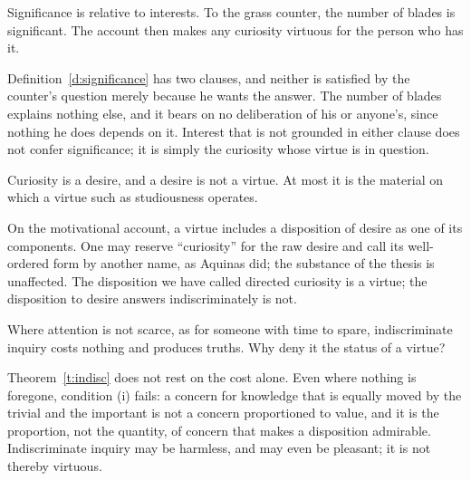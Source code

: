 \documentclass{situationist-preprint}
\begin{document}
\begin{objection}[Subjectivity]
Significance is relative to interests. To the grass counter, the number of blades is significant. The account then makes any curiosity virtuous for the person who has it.
\end{objection}

\begin{reply}
Definition~\ref{d:significance} has two clauses, and neither is satisfied by the counter's question merely because he wants the answer. The number of blades explains nothing else, and it bears on no deliberation of his or anyone's, since nothing he does depends on it. Interest that is not grounded in either clause does not confer significance; it is simply the curiosity whose virtue is in question.
\end{reply}

\begin{objection}
Curiosity is a desire, and a desire is not a virtue. At most it is the material on which a virtue such as studiousness operates.
\end{objection}

\begin{reply}
On the motivational account, a virtue includes a disposition of desire as one of its components. One may reserve \enquote{curiosity} for the raw desire and call its well-ordered form by another name, as Aquinas did; the substance of the thesis is unaffected. The disposition we have called directed curiosity is a virtue; the disposition to desire answers indiscriminately is not.
\end{reply}

\begin{objection}
Where attention is not scarce, as for someone with time to spare, indiscriminate inquiry costs nothing and produces truths. Why deny it the status of a virtue?
\end{objection}

\begin{reply}
Theorem~\ref{t:indisc} does not rest on the cost alone. Even where nothing is foregone, condition (i) fails: a concern for knowledge that is equally moved by the trivial and the important is not a concern proportioned to value, and it is the proportion, not the quantity, of concern that makes a disposition admirable. Indiscriminate inquiry may be harmless, and may even be pleasant; it is not thereby virtuous.
\end{reply}
\end{document}
